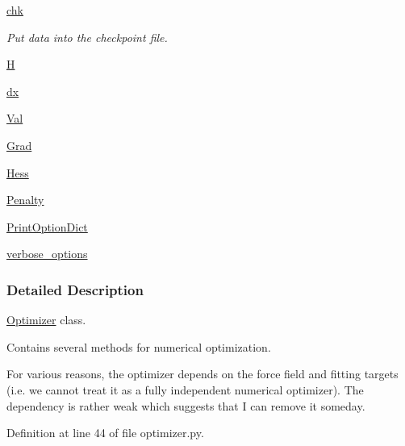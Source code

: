 \begin{DoxyCompactItemize}
\hyperlink{classforcebalance_1_1optimizer_1_1Optimizer_aab04585adf73123d3187aa7dd22e7ce2}{chk}
\begin{DoxyCompactList}\small\item\em Put data into the checkpoint file. \end{DoxyCompactList}\item 
\hyperlink{classforcebalance_1_1optimizer_1_1Optimizer_a7cf404b3b15afec4237344f09a31b6c7}{H}
\item 
\hyperlink{classforcebalance_1_1optimizer_1_1Optimizer_aaa9b39385a4d067aec12a595da09cc16}{dx}
\item 
\hyperlink{classforcebalance_1_1optimizer_1_1Optimizer_a2577b97a9ee5f3fcd4aa108a2baafc04}{Val}
\item 
\hyperlink{classforcebalance_1_1optimizer_1_1Optimizer_a91fbca8385133fa434eae3078e217fb6}{Grad}
\item 
\hyperlink{classforcebalance_1_1optimizer_1_1Optimizer_ab99276420d1c28932d2559c7f8e88922}{Hess}
\item 
\hyperlink{classforcebalance_1_1optimizer_1_1Optimizer_a5dc01aec7e22062a42cc83298c49cadd}{Penalty}
\item 
\hyperlink{classforcebalance_1_1BaseClass_afc6659278497d7245bc492ecf405ccae}{Print\-Option\-Dict}
\item 
\hyperlink{classforcebalance_1_1BaseClass_afd68efa29ccd2f320f4cf82198214aac}{verbose\-\_\-options}
\end{DoxyCompactItemize}


\subsubsection{Detailed Description}
\hyperlink{classforcebalance_1_1optimizer_1_1Optimizer}{Optimizer} class. 

Contains several methods for numerical optimization.

For various reasons, the optimizer depends on the force field and fitting targets (i.\-e. we cannot treat it as a fully independent numerical optimizer). The dependency is rather weak which suggests that I can remove it someday. 

Definition at line 44 of file optimizer.\-py.



